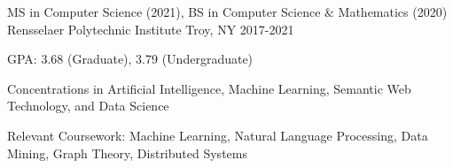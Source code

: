 


\begin{cventries}

  \cventry
  {MS in Computer Science (2021), BS in Computer Science \& Mathematics (2020)}
	{Rensselaer Polytechnic Institute}
	{Troy, NY}
	{2017-2021}
  {
    \begin{cvitems}
      \item GPA: 3.68 (Graduate), 3.79 (Undergraduate)
      \item Concentrations in Artificial Intelligence, Machine Learning, Semantic Web Technology, and Data Science
      \item Relevant Coursework: Machine Learning, Natural Language Processing, Data Mining, Graph Theory, Distributed Systems
    \end{cvitems}
  }


\end{cventries}